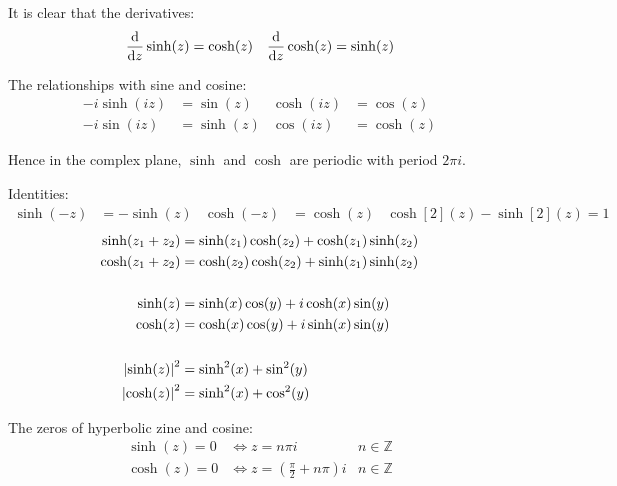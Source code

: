 \documentclass[12pt, english]{book}
\begin{document}
	It is clear that the derivatives: 
	\begin{align*}
		\dv{z} \sinh(z) &= \cosh(z) & \dv{z} \cosh(z) = \sinh(z)
	\end{align*}
	
	The relationships with sine and cosine:
	\begin{align*}
		-i\sinh(iz) &= \sin(z) & \cosh(iz) &= \cos(z) \\
		-i\sin(iz) &= \sinh(z) & \cos(iz) &= \cosh(z)
	\end{align*}
	
	Hence in the complex plane, \(\sinh\) and \(\cosh\) are periodic with period \(2\pi i\).
	
	Identities: 
	\begin{align*}
		\sinh(-z) &= -\sinh(z) & \cosh(-z) &= \cosh(z) & \cosh[2](z) - \sinh[2](z) = 1 
	\end{align*}
	\begin{align*}
		\sinh(z_1 + z_2) &= \sinh(z_1) \cosh(z_2) + \cosh(z_1) \sinh(z_2) \\
		\cosh(z_1 + z_2) &= \cosh(z_2)\cosh(z_2) + \sinh(z_1)\sinh(z_2) \\
		\\
		\sinh(z) &= \sinh(x) \cos(y) + i \cosh(x) \sin(y) \\
		\cosh(z) &= \cosh(x) \cos(y) + i \sinh(x) \sin(y) \\
		\\
		\abs{\sinh(z)}^2 &= \sinh[2](x) + \sin[2](y) \\
		\abs{\cosh(z)}^2 &= \sinh[2](x) + \cos[2](y)
	\end{align*}
	
	\begin{theorem}
		 
		\label{Zeros of Hyperbolic Sine and Cosine Theorem - Complex}
		The zeros of hyperbolic zine and cosine:
		\begin{align*}
			\sinh(z) = 0 &\iff z = n \pi i & n \in \mathbb{Z} \\
			\cosh(z) = 0 &\iff z = \left(\frac{\pi}{2} + n\pi\right)i & n \in \mathbb{Z}
		\end{align*}
	\end{theorem}
\end{document}

